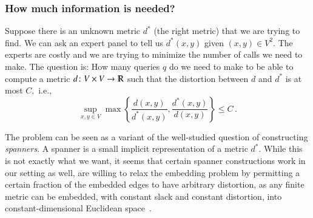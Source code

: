 \documentclass[letterpaper,11pt]{article}
\theoremstyle{definition}
\renewcommand{\mathbb}{\varmathbb}
\newcommand{\mper}{\,.}
\begin{document}
\subsubsection{How much information is needed?}
\label{sec:howmuch}
Suppose there is an unknown metric $d^*$ (the right metric) that we are trying
to find. We can ask an expert panel to tell us $d^*(x,y)$ given $(x,y)\in V^2.$
The experts are costly and we are trying to minimize the number of calls we need
to make. The question is: How many queries $q$ do we need to make to be able to compute
a metric $d\colon V\times V\to\mathbb{R}$ such that the distortion between $d$
and $d^*$ is at most $C,$ i.e.,
\begin{equation}
\sup_{x,y\in V}
\max\left\{\frac{d(x,y)}{d^*(x,y)},\frac{d^*(x,y)}{d(x,y)}\right\}\le C\mper
\end{equation}



The problem can be seen as a variant of the well-studied question of
constructing \emph{spanners}.  A spanner is a small implicit
representation of a metric $d^*.$ While this is not exactly what we want, it
seems that certain spanner constructions work in our setting as well,%
are willing to relax the embedding problem by permitting a certain fraction of
the embedded edges to have arbitrary distortion, as any finite metric can
be embedded, with constant slack and constant distortion,
into constant-dimensional Euclidean space~\cite{AbrahamBCDGKNS05}.
\end{document}
